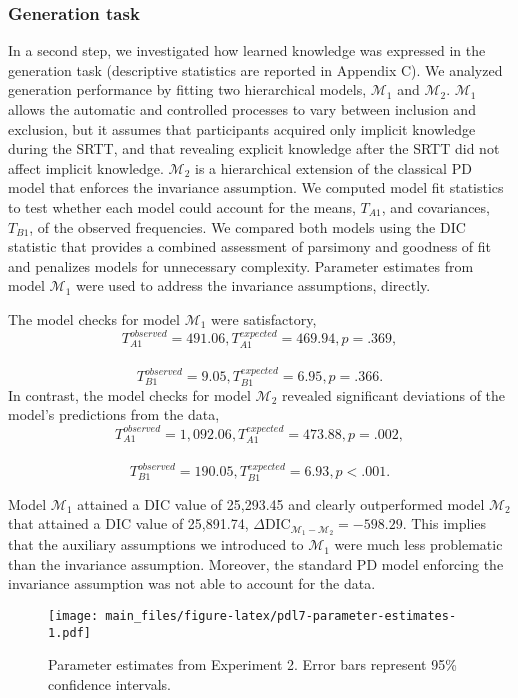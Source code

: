 \documentclass[jou]{apa6}
\theoremstyle{definition}
\theoremstyle{definition}
\theoremstyle{definition}
\theoremstyle{remark}
\begin{document}
\subsubsection{Generation task}\label{generation-task-1}

In a second step, we investigated how learned knowledge was expressed in
the generation task (descriptive statistics are reported in Appendix C).
We analyzed generation performance by fitting two hierarchical models,
\(\mathcal{M}_1\) and \(\mathcal{M}_2\). \(\mathcal{M}_1\) allows the
automatic and controlled processes to vary between inclusion and
exclusion, but it assumes that participants acquired only implicit
knowledge during the SRTT, and that revealing explicit knowledge after
the SRTT did not affect implicit knowledge. \(\mathcal{M}_2\) is a
hierarchical extension of the classical PD model that enforces the
invariance assumption. We computed model fit statistics to test whether
each model could account for the means, \(T_{A1}\), and covariances,
\(T_{B1}\), of the observed frequencies. We compared both models using
the DIC statistic that provides a combined assessment of parsimony and
goodness of fit and penalizes models for unnecessary complexity.
Parameter estimates from model \(\mathcal{M}_1\) were used to address
the invariance assumptions, directly.

The model checks for model \(\mathcal{M}_1\) were satisfactory,
\[T_{A1}^{observed} = 491.06, T_{A1}^{expected} = 469.94, p = .369,\]~
\[T_{B1}^{observed} = 9.05, T_{B1}^{expected} = 6.95, p = .366.\] In
contrast, the model checks for model \(\mathcal{M}_2\) revealed
significant deviations of the model's predictions from the data,
\[T_{A1}^{observed} = 1,092.06, T_{A1}^{expected} = 473.88, p = .002,\]~
\[T_{B1}^{observed} = 190.05, T_{B1}^{expected} = 6.93, p < .001.\]

Model \(\mathcal{M}_1\) attained a DIC value of 25,293.45 and clearly
outperformed model \(\mathcal{M}_2\) that attained a DIC value of
25,891.74,
\(\Delta \textrm{DIC}_{\mathcal{M}_1 - \mathcal{M}_2} = -598.29\). This
implies that the auxiliary assumptions we introduced to
\(\mathcal{M}_1\) were much less problematic than the invariance
assumption. Moreover, the standard PD model enforcing the invariance
assumption was not able to account for the data.

\begin{figure}[htbp]
\centering
\texttt{[image: main\_files/figure-latex/pdl7-parameter-estimates-1.pdf]}
\caption{\label{fig:pdl7-parameter-estimates}Parameter estimates from
Experiment 2. Error bars represent 95\% confidence intervals.}
\end{figure}
\end{document}
